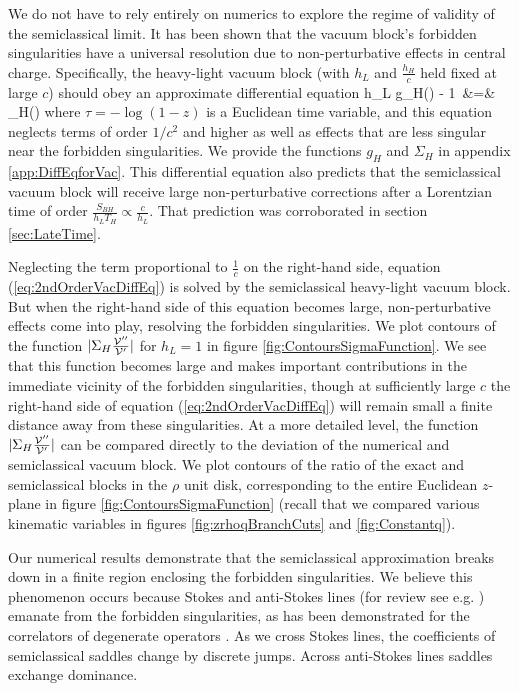 We do not have to rely entirely on numerics to explore the regime of validity of the semiclassical limit.  It has been shown that the vacuum block's forbidden singularities have a universal resolution due to non-perturbative effects in central charge.  Specifically, the heavy-light  vacuum block (with $h_L$ and $\frac{h_H}{c}$ held  fixed at large $c$) should obey an approximate differential equation \cite{Fitzpatrick:2016ive}
\be
\label{eq:2ndOrderVacDiffEq}
h_L g_H(\tau)  - 1\  &=&   \  \Sigma_{H}(\tau)  
\ee
where $\tau = -\log(1-z)$ is a Euclidean time variable, and this equation neglects terms of order $1/c^2$ and higher as well as effects that are less singular near the forbidden singularities.  We provide the functions $g_H$ and $\Sigma_H$ in appendix \ref{app:DiffEqforVac}.  This differential equation also predicts  \cite{Fitzpatrick:2016ive} that the semiclassical vacuum block will receive large non-perturbative corrections after a Lorentzian time of order $\frac{S_{BH}}{h_L T_H}  \propto \frac{c}{h_L}$. That prediction was corroborated  in section \ref{sec:LateTime}.



Neglecting the term proportional to $\frac{1}{c}$  on the right-hand side, equation (\ref{eq:2ndOrderVacDiffEq}) is solved by the semiclassical heavy-light vacuum block.  But when the right-hand side of this equation becomes large, non-perturbative effects come into play, resolving the forbidden singularities. We plot contours of the function $|\Sigma_{H} \frac{{\cal V}''}{{\cal V}'}|$ for $h_L = 1$ in figure \ref{fig:ContoursSigmaFunction}.  We see that this function becomes large and makes important contributions in the immediate vicinity of the forbidden singularities, though at sufficiently large $c$ the right-hand side of equation (\ref{eq:2ndOrderVacDiffEq}) will remain small a finite distance away from these singularities.  At a more detailed level, the function $|\Sigma_{H} \frac{{\cal V}''}{{\cal V}'}|$  can be compared directly to the deviation of the numerical and semiclassical vacuum block. We plot contours of the ratio of the exact and semiclassical blocks in the $\rho$ unit disk, corresponding to the entire Euclidean $z$-plane in figure \ref{fig:ContoursSigmaFunction} (recall that we compared various kinematic variables in figures \ref{fig:zrhoqBranchCuts} and \ref{fig:Constantq}).  


Our numerical results demonstrate that the semiclassical approximation breaks down  in a finite region enclosing the forbidden singularities.   We believe this phenomenon occurs because Stokes and anti-Stokes lines (for review see e.g. \cite{Witten:2010cx}) emanate from the forbidden singularities, as has been demonstrated for the correlators of degenerate operators \cite{Fitzpatrick:2016ive}.  As we cross Stokes lines, the coefficients of semiclassical saddles change by discrete jumps.  Across anti-Stokes lines saddles exchange dominance.  

